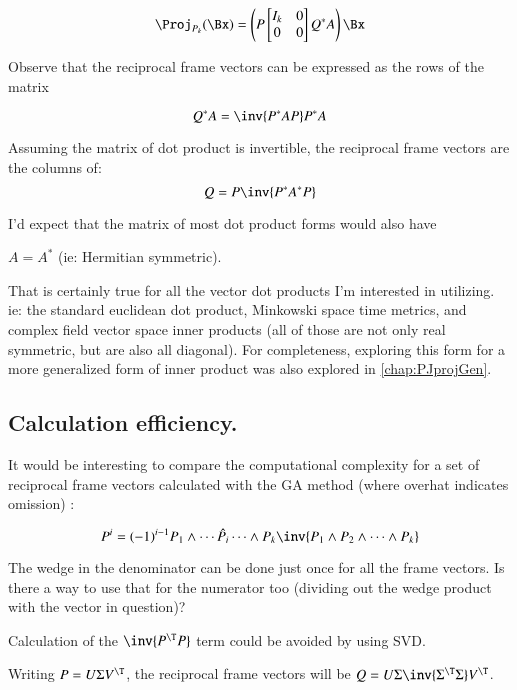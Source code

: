 \begin{equation}
\Proj_{P_k}(\Bx) =
\left(P
\begin{bmatrix}
I_k & 0 \\
0   & 0 \\
\end{bmatrix}
Q^* A\right) \Bx
\end{equation}

Observe that the reciprocal frame vectors can be expressed as the rows of the matrix

\begin{equation*}
Q^* A = \inv{P^* A P} P^* A
\end{equation*}

Assuming the matrix of dot product is invertible, the reciprocal frame vectors are the columns of:
\begin{equation}
Q = P \inv{P^* A^* P}
\end{equation}

I'd expect that the matrix of most dot product forms would also have 

$A = A^*$ (ie: Hermitian symmetric).

That is certainly true for all the vector dot products
I'm interested in utilizing. ie: the standard euclidean dot product, Minkowski space time metrics,
and complex field vector space inner products (all of those are not only real symmetric, but are also
all diagonal).  For completeness, exploring this form for a more generalized
form of inner product was also explored in \ref{chap:PJprojGen}.

\subsection{Calculation efficiency. }

It would be interesting to compare the computational complexity for a set of reciprocal frame vectors calculated with the GA method (where overhat indicates omission) :

\[
P^i = (-1)^{i-1} P_1 \wedge \cdots \hat{P_i} \cdots \wedge P_k \inv { P_1 \wedge P_2 \wedge \cdots \wedge P_k }
\]

The wedge in the denominator can be done just once for all the frame vectors.  Is there a way to use that for the numerator too (dividing out the wedge product with the vector in question)?

Calculation of the $\inv{P^\T P}$ term could be avoided by using SVD.

Writing $P = U \Sigma V^\T$, the reciprocal frame vectors will be $Q = U \Sigma \inv{\Sigma^\T \Sigma} V^\T$.

